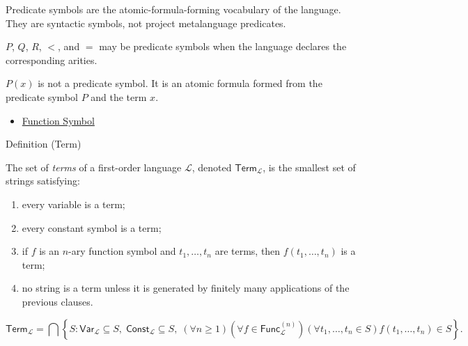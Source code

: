 \begin{remark*}[Interpretation]
Predicate symbols are the atomic-formula-forming vocabulary of the language.
They are syntactic symbols, not project metalanguage predicates.
\end{remark*}

\begin{remark*}[Examples]
\(P\), \(Q\), \(R\), \(<\), and \(=\) may be predicate symbols when the language
declares the corresponding arities.
\end{remark*}

\begin{remark*}
\(P(x)\) is not a predicate symbol. It is an atomic formula formed from the
predicate symbol \(P\) and the term \(x\).
\end{remark*}

\begin{dependencies}
\begin{itemize}
  \item \hyperref[def:function-symbol]{Function Symbol}
\end{itemize}
\end{dependencies}

\begin{definitionbox}{Definition (Term)}
\begin{definition}[Term]
\label{def:term}
The set of \emph{terms} of a first-order language \(\mathcal L\), denoted
\(\mathsf{Term}_{\mathcal L}\), is the smallest set of strings satisfying:
\begin{enumerate}
\item every variable is a term;
\item every constant symbol is a term;
\item if \(f\) is an \(n\)-ary function symbol and
      \(t_1,\ldots,t_n\) are terms, then \(f(t_1,\ldots,t_n)\) is a term;
\item no string is a term unless it is generated by finitely many applications
      of the previous clauses.
\end{enumerate}
\end{definition}
\end{definitionbox}

\begin{remark*}
\[
\mathsf{Term}_{\mathcal L}
=
\bigcap
\left\{
S:
\mathsf{Var}_{\mathcal L}\subseteq S,\;
\mathsf{Const}_{\mathcal L}\subseteq S,\;
(\forall n\geq 1)(\forall f\in\mathsf{Func}_{\mathcal L}^{(n)})
(\forall t_1,\ldots,t_n\in S)
f(t_1,\ldots,t_n)\in S
\right\}.
\]
\end{remark*}

